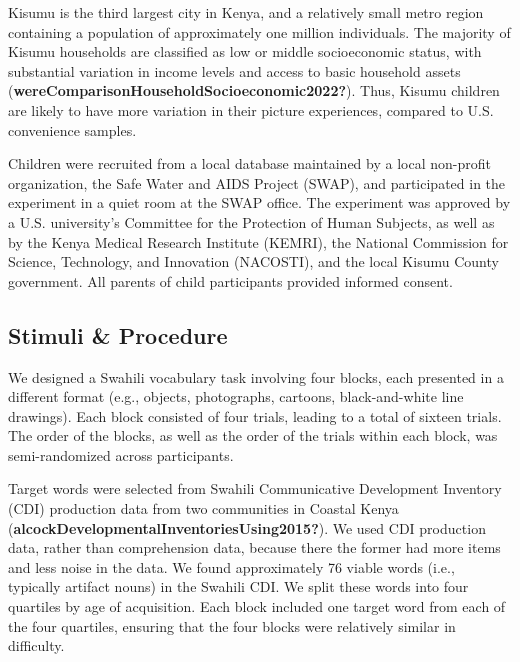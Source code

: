 \documentclass[10pt, letterpaper]{article}
\begin{document}
Kisumu is the third largest city in Kenya, and a relatively small metro
region containing a population of approximately one million individuals.
The majority of Kisumu households are classified as low or middle
socioeconomic status, with substantial variation in income levels and
access to basic household assets
(\textbf{wereComparisonHouseholdSocioeconomic2022?}). Thus, Kisumu
children are likely to have more variation in their picture experiences,
compared to U.S. convenience samples.

Children were recruited from a local database maintained by a local
non-profit organization, the Safe Water and AIDS Project (SWAP), and
participated in the experiment in a quiet room at the SWAP office. The
experiment was approved by a U.S. university's Committee for the
Protection of Human Subjects, as well as by the Kenya Medical Research
Institute (KEMRI), the National Commission for Science, Technology, and
Innovation (NACOSTI), and the local Kisumu County government. All
parents of child participants provided informed consent.

\subsection{Stimuli \& Procedure}\label{stimuli-procedure}

We designed a Swahili vocabulary task involving four blocks, each
presented in a different format (e.g., objects, photographs, cartoons,
black-and-white line drawings). Each block consisted of four trials,
leading to a total of sixteen trials. The order of the blocks, as well
as the order of the trials within each block, was semi-randomized across
participants.

Target words were selected from Swahili Communicative Development
Inventory (CDI) production data from two communities in Coastal Kenya
(\textbf{alcockDevelopmentalInventoriesUsing2015?}). We used CDI
production data, rather than comprehension data, because there the
former had more items and less noise in the data. We found approximately
76 viable words (i.e., typically artifact nouns) in the Swahili CDI. We
split these words into four quartiles by age of acquisition. Each block
included one target word from each of the four quartiles, ensuring that
the four blocks were relatively similar in difficulty.
\end{document}
